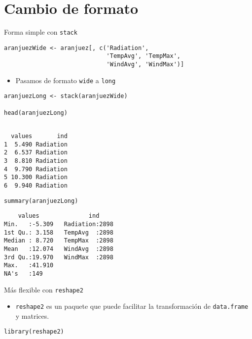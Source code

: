 \documentclass[xcolor={usenames,svgnames,dvipsnames}]{beamer}
\begin{document}
\section{Cambio de formato}
\label{sec:org9021f69}
\begin{frame}[label={sec:orgd7fc629},fragile]{Forma simple con \texttt{stack}}
 \lstset{language=r,label= ,caption= ,captionpos=b,numbers=none}
\begin{lstlisting}
aranjuezWide <- aranjuez[, c('Radiation',
                             'TempAvg', 'TempMax',
                             'WindAvg', 'WindMax')]
\end{lstlisting}

\begin{itemize}
\item Pasamos de formato \texttt{wide} a \texttt{long}
\end{itemize}
\lstset{language=r,label= ,caption= ,captionpos=b,numbers=none}
\begin{lstlisting}
aranjuezLong <- stack(aranjuezWide)

head(aranjuezLong)
\end{lstlisting}

\begin{verbatim}

  values       ind
1  5.490 Radiation
2  6.537 Radiation
3  8.810 Radiation
4  9.790 Radiation
5 10.300 Radiation
6  9.940 Radiation
\end{verbatim}


\lstset{language=r,label= ,caption= ,captionpos=b,numbers=none}
\begin{lstlisting}
summary(aranjuezLong)
\end{lstlisting}

\begin{verbatim}
    values              ind      
Min.   :-5.309   Radiation:2898  
1st Qu.: 3.158   TempAvg  :2898  
Median : 8.720   TempMax  :2898  
Mean   :12.074   WindAvg  :2898  
3rd Qu.:19.970   WindMax  :2898  
Max.   :41.910                   
NA's   :149
\end{verbatim}
\end{frame}

\begin{frame}[label={sec:orgb5ee68f},fragile]{Más flexible con \texttt{reshape2}}
 \begin{itemize}
\item \texttt{reshape2} es un paquete que puede facilitar la transformación de \texttt{data.frame} y matrices.
\end{itemize}

\lstset{language=r,label= ,caption= ,captionpos=b,numbers=none}
\begin{lstlisting}
library(reshape2)
\end{lstlisting}
\end{frame}
\end{document}
